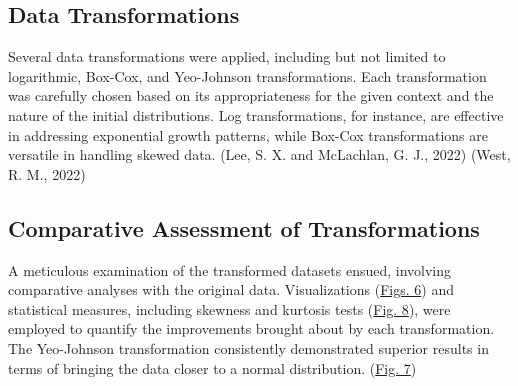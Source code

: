 \documentclass[
  letterpaper,
  DIV=11,
  numbers=noendperiod,
  oneside]{scrartcl}
\begin{document}
\hypertarget{data-transformations}{%
\subsection{Data Transformations}\label{data-transformations}}

Several data transformations were applied, including but not limited to
logarithmic, Box-Cox, and Yeo-Johnson transformations. Each
transformation was carefully chosen based on its appropriateness for the
given context and the nature of the initial distributions. Log
transformations, for instance, are effective in addressing exponential
growth patterns, while Box-Cox transformations are versatile in handling
skewed data. (Lee, S. X. and McLachlan, G. J., 2022) (West, R. M., 2022)

\hypertarget{comparative-assessment-of-transformations}{%
\subsection{Comparative Assessment of
Transformations}\label{comparative-assessment-of-transformations}}

A meticulous examination of the transformed datasets ensued, involving
comparative analyses with the original data. Visualizations
(\protect\hyperlink{fig-transcomp}{Figs. 6}) and statistical measures,
including skewness and kurtosis tests
(\protect\hyperlink{fig-transskews}{Fig. 8}), were employed to quantify
the improvements brought about by each transformation. The Yeo-Johnson
transformation consistently demonstrated superior results in terms of
bringing the data closer to a normal distribution.
(\protect\hyperlink{fig-yeojdists}{Fig. 7})
\end{document}
